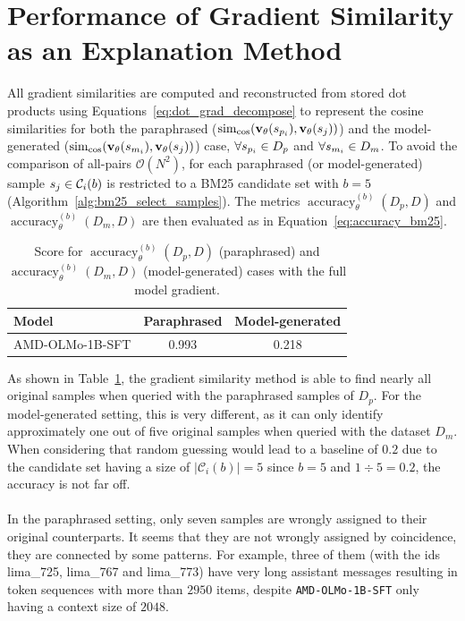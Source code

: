 \section{Performance of Gradient Similarity as an Explanation Method}\label{sec:baseline_perf}
All gradient similarities are computed and reconstructed from stored dot products using Equations~\ref{eq:dot_grad_decompose} to represent the cosine similarities for both the paraphrased ($\operatorname{sim}_{\cos}(\mathbf{v}_{\theta}(s_{p_i}), \mathbf{v}_{\theta}(s_j))$) and the model-generated ($\operatorname{sim}_{\cos}(\mathbf{v}_{\theta}(s_{m_i}), \mathbf{v}_{\theta}(s_j))$) case, $\forall s_{p_i} \in D_p$ and $\forall s_{m_i} \in D_m$. To avoid the comparison of all-pairs $\mathcal{O}(N^2)$, for each paraphrased (or model-generated) sample $s_j \in \mathcal{C}_i(b)$ is restricted to a BM25 candidate set with $b=5$ (Algorithm~\ref{alg:bm25_select_samples}). The metrics $\operatorname{accuracy}^{(b)}_{\theta}(D_p,D)$ and $\operatorname{accuracy}^{(b)}_{\theta}(D_m,D)$ are then evaluated as in Equation~\ref{eq:accuracy_bm25}.
\begin{table}[h]
    \centering
    \begin{tabular}{|l|c|c|}
        \hline
        \textbf{Model} & \textbf{Paraphrased} & \textbf{Model-generated} \\
        \hline
        AMD-OLMo-1B-SFT & 0.993 & 0.218 \\
        \hline
    \end{tabular}
    \caption{Score for $\operatorname{accuracy}^{(b)}_{\theta}(D_p,D)$ (paraphrased) and $\operatorname{accuracy}^{(b)}_{\theta}(D_m,D)$ (model-generated) cases with the full model gradient.}
    \label{tab:model_accuracy}
\end{table}
As shown in Table~\ref{tab:model_accuracy}, the gradient similarity method is able to find nearly all original samples when queried with the paraphrased samples of $D_p$. For the model-generated setting, this is very different, as it can only identify approximately one out of five original samples when queried with the dataset $D_m$. When considering that random guessing would lead to a baseline of $0.2$ due to the candidate set having a size of $\lvert\mathcal{C}_i(b)\rvert = 5$ since $b=5$ and $1 \div 5=0.2$, the accuracy is not far off.
\\\\
In the paraphrased setting, only seven samples are wrongly assigned to their original counterparts. It seems that they are not wrongly assigned by coincidence, they are connected by some patterns. For example, three of them (with the ids lima\_725, lima\_767 and lima\_773) have very long assistant messages resulting in token sequences with more than $2950$ items, despite \texttt{AMD-OLMo-1B-SFT} only having a context size of $2048$. 

